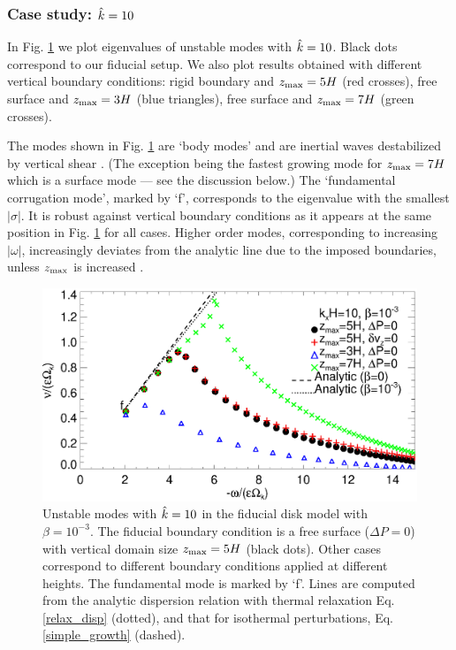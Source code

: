 \subsubsection{Case study: $\hat{k}=10$}
In Fig. \ref{compare_modes_iso_kx10} we plot eigenvalues of unstable 
modes with $\hat{k}=10$. Black dots correspond to our fiducial setup.  
We also plot results obtained with different 
vertical boundary conditions: rigid boundary and $z_\mathrm{max}=5H$ (red
crosses),  free surface and $z_\mathrm{max} = 3H$ (blue triangles), free surface
and $z_\mathrm{max}=7H$ (green crosses). 

The modes shown in Fig. \ref{compare_modes_iso_kx10} are `body modes'
and are inertial waves destabilized by vertical shear
\citep{barker15}. (The exception being the fastest growing
mode for $z_\mathrm{max}=7H$ which is a surface mode --- see the discussion
below.)  The `fundamental corrugation mode', marked by `f',
corresponds to the eigenvalue with the smallest $|\sigma|$. It is robust
against vertical boundary conditions as it appears at the same
position in Fig. \ref{compare_modes_iso_kx10} for all cases. Higher  
order modes, corresponding to increasing $|\omega|$, increasingly
deviates from the analytic line due to the imposed boundaries, 
unless $z_\mathrm{max}$ is increased \citep{barker15}. 

\begin{figure}
  \includegraphics[width=\linewidth]{figures/compare_modes_iso_kx10_analytic.ps}
  \caption{Unstable modes with $\hat{k}=10$ in the fiducial disk model
    with $\beta=10^{-3}$. %
    The fiducial boundary condition is a free surface ($\Delta P=0$)
    with vertical domain size $z_\mathrm{max}=5H$  (black dots).  Other
    cases correspond to different boundary conditions applied at
    different heights. The fundamental mode is marked by `f'. Lines
    are computed from the analytic dispersion relation 
    with thermal relaxation Eq. \ref{relax_disp} (dotted), and that for
    isothermal perturbations, Eq. \ref{simple_growth} (dashed). 
    \label{compare_modes_iso_kx10} 
  }
\end{figure}

